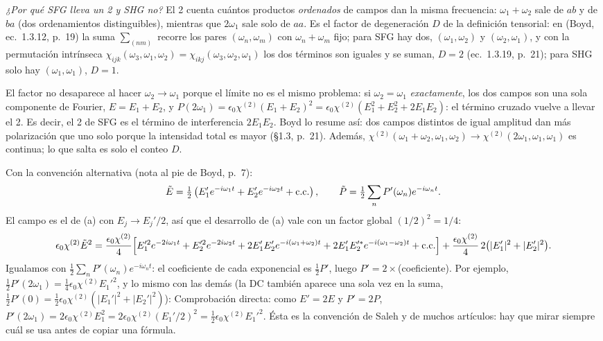 \emph{¿Por qué SFG lleva un 2 y SHG no?} El 2 cuenta cuántos productos \emph{ordenados} de campos dan la misma frecuencia: $\omega_1+\omega_2$ sale de $ab$ y de $ba$ (dos ordenamientos distinguibles), mientras que $2\omega_1$ sale solo de $aa$. Es el factor de degeneración $D$ de la definición tensorial: en (Boyd, ec.~1.3.12, p.~19) la suma $\sum_{(nm)}$ recorre los pares $(\omega_n,\omega_m)$ con $\omega_n+\omega_m$ fijo; para SFG hay dos, $(\omega_1,\omega_2)$ y $(\omega_2,\omega_1)$, y con la permutación intrínseca $\chi_{ijk}(\omega_3,\omega_1,\omega_2)=\chi_{ikj}(\omega_3,\omega_2,\omega_1)$ los dos términos son iguales y se suman, $D=2$ (ec.~1.3.19, p.~21); para SHG solo hay $(\omega_1,\omega_1)$, $D=1$.

El factor no desaparece al hacer $\omega_2\to\omega_1$ porque el límite no es el mismo problema: si $\omega_2=\omega_1$ \emph{exactamente}, los dos campos son una sola componente de Fourier, $E=E_1+E_2$, y $P(2\omega_1)=\epsilon_0\chi^{(2)}(E_1+E_2)^2=\epsilon_0\chi^{(2)}(E_1^2+E_2^2+2E_1E_2)$: el término cruzado vuelve a llevar el 2. Es decir, el 2 de SFG es el término de interferencia $2E_1E_2$. Boyd lo resume así: dos campos distintos de igual amplitud dan más polarización que uno solo porque la intensidad total es mayor (§1.3, p.~21). Además, $\chi^{(2)}(\omega_1+\omega_2,\omega_1,\omega_2)\to\chi^{(2)}(2\omega_1,\omega_1,\omega_1)$ es continua; lo que salta es solo el conteo $D$.

 Con la convención alternativa (nota al pie de Boyd, p.~7):
\[
\tilde E=\tfrac12\left(E_1'e^{-i\omega_1t}+E_2'e^{-i\omega_2t}+\text{c.c.}\right),\qquad \tilde P=\tfrac12\sum_nP'(\omega_n)e^{-i\omega_nt}.
\]
El campo es el de (a) con $E_j\to E_j'/2$, así que el desarrollo de (a) vale con un factor global $(1/2)^2=1/4$:
\[
\epsilon_0\chi^{(2)}\tilde E^2=\frac{\epsilon_0\chi^{(2)}}{4}\Big[E_1'^2e^{-2i\omega_1t}+E_2'^2e^{-2i\omega_2t}+2E_1'E_2'e^{-i(\omega_1+\omega_2)t}+2E_1'E_2'^*e^{-i(\omega_1-\omega_2)t}+\text{c.c.}\Big]+\frac{\epsilon_0\chi^{(2)}}{4}\,2\big(|E_1'|^2+|E_2'|^2\big).
\]
Igualamos con $\tfrac12\sum_nP'(\omega_n)e^{-i\omega_nt}$: el coeficiente de cada exponencial es $\tfrac12P'$, luego $P'=2\times$(coeficiente). Por ejemplo, $\tfrac12P'(2\omega_1)=\tfrac14\epsilon_0\chi^{(2)}E_1'^2$, y lo mismo con las demás (la DC también aparece una sola vez en la suma, $\tfrac12P'(0)=\tfrac12\epsilon_0\chi^{(2)}(|E_1'|^2+|E_2'|^2)$):
Comprobación directa: como $E'=2E$ y $P'=2P$, $P'(2\omega_1)=2\epsilon_0\chi^{(2)}E_1^2=2\epsilon_0\chi^{(2)}(E_1'/2)^2=\tfrac12\epsilon_0\chi^{(2)}E_1'^2$. Ésta es la convención de Saleh y de muchos artículos: hay que mirar siempre cuál se usa antes de copiar una fórmula.

